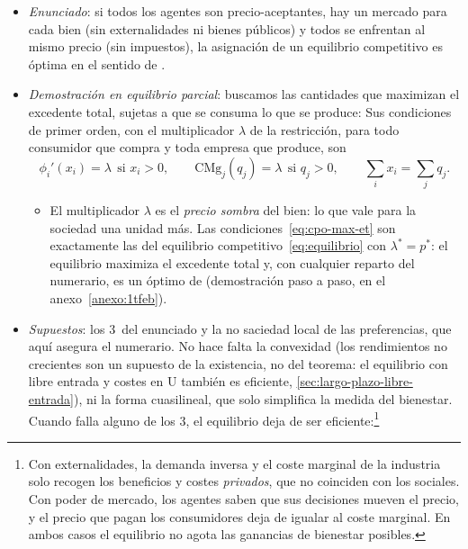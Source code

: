 \documentclass[11pt]{article}
\begin{document}
\begin{itemize}
\item \emph{Enunciado}: si todos los agentes son precio-aceptantes, hay un mercado para cada bien (sin externalidades ni bienes públicos) y todos se enfrentan al mismo precio (sin impuestos), la asignación de un equilibrio competitivo es óptima en el sentido de .
\item \emph{Demostración en equilibrio parcial}: buscamos las cantidades que maximizan el excedente total, sujetas a que se consuma lo que se produce:
  Sus condiciones de primer orden, con el multiplicador $\lambda$ de la restricción, para todo consumidor que compra y toda empresa que produce, son
  \begin{equation}
  \phi_i'(x_i)=\lambda\ \ \text{si }x_i>0,\qquad \mathrm{CMg}_j(q_j)=\lambda\ \ \text{si }q_j>0,\qquad \sum_ix_i=\sum_jq_j. \label{eq:cpo-max-et}
  \end{equation}
  \begin{itemize}
  \item El multiplicador $\lambda$ es el \emph{precio sombra} del bien: lo que vale para la sociedad una unidad más. Las condiciones~\eqref{eq:cpo-max-et} son exactamente las del equilibrio competitivo~\eqref{eq:equilibrio} con $\lambda^*=p^*$: el equilibrio maximiza el excedente total y, con cualquier reparto del numerario, es un óptimo de  (demostración paso a paso, en el anexo~\ref{anexo:1tfeb}).\findemo
  \end{itemize}
\item \emph{Supuestos}: los 3~del enunciado y la no saciedad local de las preferencias, que aquí asegura el numerario. No hace falta la convexidad (los rendimientos no crecientes son un supuesto de la existencia, no del teorema: el equilibrio con libre entrada y costes en U también es eficiente, \ref{sec:largo-plazo-libre-entrada}), ni la forma cuasilineal, que solo simplifica la medida del bienestar. Cuando falla alguno de los 3, el equilibrio deja de ser eficiente:\footnote{Con externalidades, la demanda inversa y el coste marginal de la industria solo recogen los beneficios y costes \emph{privados}, que no coinciden con los sociales. Con poder de mercado, los agentes saben que sus decisiones mueven el precio, y el precio que pagan los consumidores deja de igualar al coste marginal. En ambos casos el equilibrio no agota las ganancias de bienestar posibles.}

\end{itemize}
\end{document}
